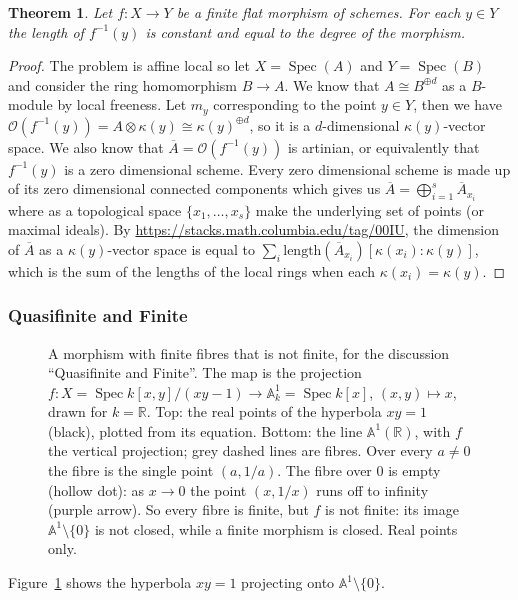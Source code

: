 \documentclass[12pt]{article}
\numberwithin{equation}{section}
\newtheorem{theorem}{Theorem}[subsection]
\theoremstyle{definition}
\theoremstyle{remark}
\newcommand{\RR}{\mathbb{R}}
\newcommand{\Ocal}{\mathcal{O}}
\renewcommand{\AA}{\mathbb{A}}
\newcommand{\Spec}{\operatorname{Spec}}
\begin{document}
\begin{theorem}
	Let $f:X \to Y$ be a finite flat morphism of schemes. 
	For each $y\in Y$ the length of $f^{-1}(y)$ is constant and equal to the degree of the morphism. 
\end{theorem}
\begin{proof}
	The problem is affine local so let $X=\Spec(A)$ and $Y=\Spec(B)$ and consider the ring homomorphism $B\to A$.
	We know that $A\cong B^{\oplus d}$ as a $B$-module by local freeness.
	Let $m_y$ corresponding to the point $y\in Y$, then we have $\Ocal(f^{-1}(y))=A\otimes \kappa(y) \cong \kappa(y)^{\oplus d}$, so it is a $d$-dimensional $\kappa(y)$-vector space. 
	We also know that $\overline{A}=\Ocal(f^{-1}(y))$ is artinian, or equivalently that $f^{-1}(y)$ is a zero dimensional scheme. 
	Every zero dimensional scheme is made up of its zero dimensional connected components which gives us $\overline{A}= \bigoplus_{i=1}^s \overline{A}_{x_i}$ where as a topological space $\lbrace x_1,\ldots,x_s\rbrace$ make the underlying set of points (or maximal ideals). 
	By \url{https://stacks.math.columbia.edu/tag/00IU}, the dimension of $\overline{A}$ as a $\kappa(y)$-vector space is equal to $\sum_i \mathrm{length}(\overline{A}_{x_i})[\kappa(x_i):\kappa(y)]$, which is the sum of the lengths of the local rings when each $\kappa(x_i)=\kappa(y)$.
\end{proof}

\subsubsection{Quasifinite and Finite}
\begin{figure}[H]
\centering

\caption{A morphism with finite fibres that is not finite, for the discussion ``Quasifinite and Finite''. The map is the projection $f:X=\Spec k[x,y]/(xy-1)\to\AA^1_k=\Spec k[x]$, $(x,y)\mapsto x$, drawn for $k=\RR$. Top: the real points of the hyperbola $xy=1$ (black), plotted from its equation. Bottom: the line $\AA^1(\RR)$, with $f$ the vertical projection; grey dashed lines are fibres. Over every $a\neq0$ the fibre is the single point $(a,1/a)$. The fibre over $0$ is empty (hollow dot): as $x\to0$ the point $(x,1/x)$ runs off to infinity (purple arrow). So every fibre is finite, but $f$ is not finite: its image $\AA^1\setminus\{0\}$ is not closed, while a finite morphism is closed. Real points only.}\label{fig:hyperbola-quasi-finite}
\end{figure}
Figure~\ref{fig:hyperbola-quasi-finite} shows the hyperbola $xy=1$ projecting onto $\AA^1\setminus\{0\}$.
\end{document}
